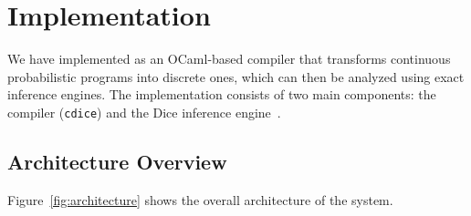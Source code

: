 \section{Implementation}\label{sec:implementation}

We have implemented \Slice{} as an OCaml-based compiler that transforms continuous probabilistic programs into discrete ones, which can then be analyzed using exact inference engines. The implementation consists of two main components: the \Slice{} compiler (\texttt{cdice}) and the Dice inference engine~\cite{Holtzen2020Dice}.

\subsection{Architecture Overview}

Figure~\ref{fig:architecture} shows the overall architecture of the \Slice{} system.

